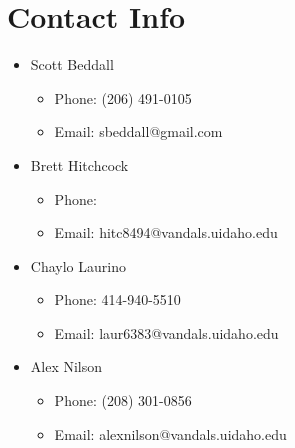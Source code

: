 \documentclass{article}
\begin{document}
\section{Contact Info}
\begin{itemize}
\item Scott Beddall 
  \begin{itemize}
    \item Phone: (206) 491-0105
    \item Email: sbeddall@gmail.com
  \end{itemize}
\item Brett Hitchcock
  \begin{itemize}
    \item Phone: 
    \item Email: hitc8494@vandals.uidaho.edu
  \end{itemize}
\item Chaylo Laurino
  \begin{itemize}
    \item Phone: 414-940-5510
    \item Email: laur6383@vandals.uidaho.edu
  \end{itemize}
\item Alex Nilson
  \begin{itemize}
    \item Phone: (208) 301-0856
    \item Email: alexnilson@vandals.uidaho.edu
  \end{itemize}
\end{itemize}
\end{document}
